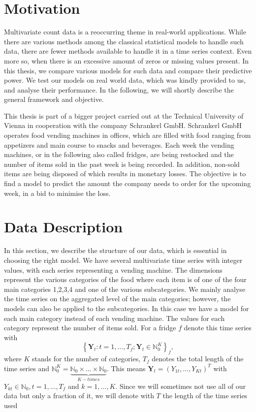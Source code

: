 \section{Motivation}
\label{sec:Motivation}

Multivariate count data is a reoccurring theme in real-world applications. While there are various methods among the classical statistical models to handle such data, there are fewer methods available to handle it in a time series context. Even more so, when there is an excessive amount of zeros or missing values present. In this thesis, we compare various models for such data and compare their predictive power. We test our models on real world data, which was kindly provided to us, and analyse their performance. In the following, we will shortly describe the general framework and objective. 

This thesis is part of a bigger project carried out at the Technical University of Vienna in cooperation with the company Schrankerl GmbH. Schrankerl GmbH operates food vending machines in offices, which are filled with food ranging from appetizers and main course to snacks and beverages. Each week the vending machines, or in the following also called fridges, are being restocked and the number of items sold in the past week is being recorded. In addition, non-sold items are being disposed of which results in monetary losses. The objective is to find a model to predict the amount the company needs to order for the upcoming week, in a bid to minimise the loss.

\section{Data Description}
\label{sec: Data Description}

In this section, we describe the structure of our data, which is essential in choosing the right model. We have several multivariate time series with integer values, with each series representing a vending machine. The dimensions represent the various categories of the food where each item is of one of the four main categories 1,2,3,4 and one of the various subcategories. We mainly analyse the time series on the aggregated level of the main categories; however, the models can also be applied to the subcategories. In this case we have a model for each main category instead of each vending machine. The values for each category represent the number of items sold. For a fridge $f$ denote this time series with 
%
\begin{equation}
\left\{\bm{Y}_t:t=1,\ldots,T_f; \bm{Y}_t \in \mathbb{N}_0^K \right\}_f,
\label{eq:time series definition}
\end{equation}
%
where $K$ stands for the number of categories, $T_f$ denotes the total length of the time series and $\mathbb{N}_0^K = \underbrace{\mathbb{N}_0 \times \ldots \times \mathbb{N}_0}_{K-times}$. This means $\bm{Y}_t = (Y_{1t},\ldots,Y_{Kt})^T$ with $Y_{kt} \in \mathbb{N}_0, t=1,\ldots,T_f$ and $k=1,\ldots,K$. Since we will sometimes not use all of our data but only a fraction of it, we will denote with $T$ the length of the time series used

